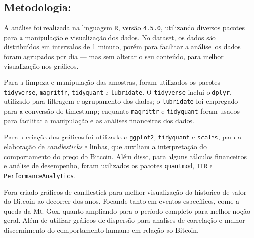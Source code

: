 \subsection{\textbf{Metodologia:}}

A análise foi realizada na linguagem \texttt{R}, versão \texttt{4.5.0}, utilizando diversos pacotes para a manipulação e visualização dos dados. No dataset, os dados são distribuídos em intervalos de 1 minuto, porém para facilitar a análise, os dados foram agrupados por dia — mas sem alterar o seu conteúdo, para melhor visualização nos gráficos.

Para a limpeza e manipulação das amostras, foram utilizados os pacotes \texttt{tidyverse}, \texttt{magrittr}, \texttt{tidyquant} e \texttt{lubridate}. O \texttt{tidyverse} inclui o \texttt{dplyr}, utilizado para filtragem e agrupamento dos dados; o \texttt{lubridate} foi empregado para a conversão do timestamp; enquanto \texttt{magrittr} e \texttt{tidyquant} foram usados para facilitar a manipulação e as análises financeiras dos dados.

Para a criação dos gráficos foi utilizado o \texttt{ggplot2}, \texttt{tidyquant} e \texttt{scales}, para a elaboração de \textit{candlesticks} e linhas, que auxiliam a interpretação do comportamento do preço do Bitcoin. Além disso, para alguns cálculos financeiros e análise de desempenho, foram utilizados os pacotes \texttt{quantmod}, \texttt{TTR} e \texttt{PerformanceAnalytics}.

Fora criado gráficos de candlestick  para melhor visualização do historico de valor do Bitcoin ao decorrer dos anos. Focando tanto em eventos específicos, como a queda da Mt. Gox, quanto ampliando para o período completo para melhor noção geral. Além de utilizar gráficos de dispersão para analises de correlação e melhor discernimento do comportamento humano em relação ao Bitcoin.